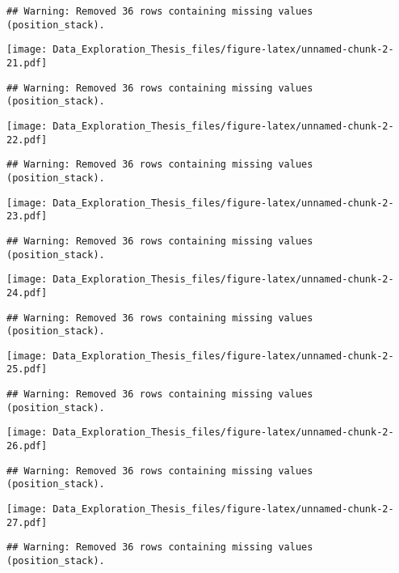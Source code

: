 \documentclass[]{article}
\begin{document}
\begin{verbatim}
## Warning: Removed 36 rows containing missing values (position_stack).
\end{verbatim}

\texttt{[image: Data\_Exploration\_Thesis\_files/figure-latex/unnamed-chunk-2-21.pdf]}

\begin{verbatim}
## Warning: Removed 36 rows containing missing values (position_stack).
\end{verbatim}

\texttt{[image: Data\_Exploration\_Thesis\_files/figure-latex/unnamed-chunk-2-22.pdf]}

\begin{verbatim}
## Warning: Removed 36 rows containing missing values (position_stack).
\end{verbatim}

\texttt{[image: Data\_Exploration\_Thesis\_files/figure-latex/unnamed-chunk-2-23.pdf]}

\begin{verbatim}
## Warning: Removed 36 rows containing missing values (position_stack).
\end{verbatim}

\texttt{[image: Data\_Exploration\_Thesis\_files/figure-latex/unnamed-chunk-2-24.pdf]}

\begin{verbatim}
## Warning: Removed 36 rows containing missing values (position_stack).
\end{verbatim}

\texttt{[image: Data\_Exploration\_Thesis\_files/figure-latex/unnamed-chunk-2-25.pdf]}

\begin{verbatim}
## Warning: Removed 36 rows containing missing values (position_stack).
\end{verbatim}

\texttt{[image: Data\_Exploration\_Thesis\_files/figure-latex/unnamed-chunk-2-26.pdf]}

\begin{verbatim}
## Warning: Removed 36 rows containing missing values (position_stack).
\end{verbatim}

\texttt{[image: Data\_Exploration\_Thesis\_files/figure-latex/unnamed-chunk-2-27.pdf]}

\begin{verbatim}
## Warning: Removed 36 rows containing missing values (position_stack).
\end{verbatim}
\end{document}
